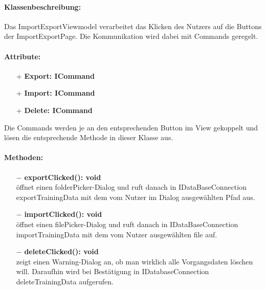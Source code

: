 \documentclass[a4paper,12pt]{article}
\begin{document}
\paragraph{Klassenbeschreibung:}
Das ImportExportViewmodel verarbeitet das Klicken des Nutzers auf die Buttons  der ImportExportPage.
Die Kommunikation wird dabei mit Commands geregelt.
\paragraph{Attribute:}
\begin{itemize}
	\item[+] \textbf{Export: ICommand}
	\item[+] \textbf{Import: ICommand}
	\item[+] \textbf{Delete: ICommand}
\end{itemize}
Die Commands werden je an den entsprechenden Button im View gekoppelt und lösen die entsprechende Methode in dieser Klasse aus.
\paragraph{Methoden:}
\begin{itemize}
    \item[$-$] \textbf{exportClicked(): void}\\ öffnet einen folderPicker-Dialog und ruft danach in IDataBaseConnection exportTrainingData mit dem vom Nutzer im Dialog ausgewählten Pfad aus.%
    \item[$-$] \textbf{importClicked(): void}\\ öffnet einen filePicker-Dialog und ruft danach in IDataBaseConnection importTrainingData mit dem vom Nutzer ausgewählten file auf.
    \item[$-$] \textbf{deleteClicked(): void}\\zeigt einen Warning-Dialog an, ob man wirklich alle Vorgangsdaten löschen will. Daraufhin wird bei Bestätigung in IDatabaseConnection deleteTrainingData aufgerufen.
\end{itemize} 
\end{document}

